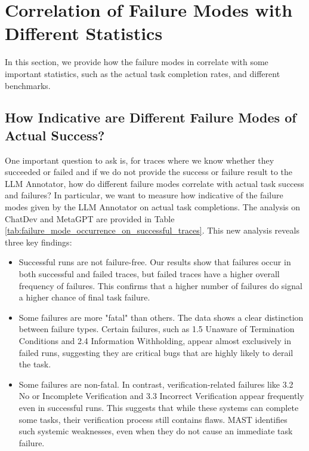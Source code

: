 \section{Correlation of Failure Modes with Different Statistics}
\label{sec:mast_correlations}

In this section, we provide how the failure modes in \taxonomy{} correlate with some important statistics, such as the actual task completion rates, and different benchmarks.


\subsection{How Indicative are Different Failure Modes of Actual Success?}

One important question to ask is, for traces where we know whether they succeeded or failed and if we do not provide the success or failure result to the LLM Annotator, how do different failure modes correlate with actual task success and failures? In particular, we want to measure how indicative of the failure modes given by the LLM Annotator on actual task completions. The analysis on ChatDev and MetaGPT are provided in Table \ref{tab:failure_mode_occurrence_on_successful_traces}.  This new analysis reveals three key findings:
\begin{itemize}
    \item Successful runs are not failure-free. Our results show that failures occur in both successful and failed traces, but failed traces have a higher overall frequency of failures. This confirms that a higher number of failures do signal a higher chance of final task failure.
    \item Some failures are more "fatal" than others. The data shows a clear distinction between failure types. Certain failures, such as 1.5 Unaware of Termination Conditions and 2.4 Information Withholding, appear almost exclusively in failed runs, suggesting they are critical bugs that are highly likely to derail the task.
    \item Some failures are non-fatal. In contrast, verification-related failures like 3.2 No or Incomplete Verification and 3.3 Incorrect Verification appear frequently even in successful runs. This suggests that while these systems can complete some tasks, their verification process still contains flaws. MAST identifies such systemic weaknesses, even when they do not cause an immediate task failure.
\end{itemize}



